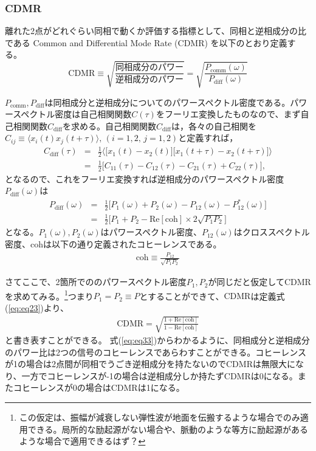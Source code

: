 \subsubsection{CDMR}
離れた2点がどれぐらい同相で動くか評価する指標として、同相と逆相成分の比である Common and Differential Mode Rate (CDMR) を以下のとおり定義する。
\begin{equation}
  \boxed{\mathrm{CDMR} \equiv \sqrt{\frac{同相成分のパワー}{逆相成分のパワー}} = \sqrt{\frac{P_{\mathrm{comm}}(\omega)}{P_{\mathrm{diff}}(\omega)}}} \label{eq:eq23}
\end{equation}

$P_{\mathrm{comm}},P_{\mathrm{diff}}$は同相成分と逆相成分についてのパワースペクトル密度である。パワースペクトル密度は自己相関関数$C(\tau)$をフーリエ変換したものなので、まず自己相関関数$C_{\mathrm{diff}}$を求める。自己相関関数$C_{\mathrm{diff}}$は，各々の自己相関を$ C_{ij} \equiv \langle x_{i}(t)x_{j}(t+\tau)\rangle,\, (i=1,2,\,j=1,2)$と定義すれば， 
\begin{eqnarray}
  C_{\mathrm{diff}}(\tau) &=& \frac{1}{2}
  \biggl\langle
  \biggl[ x_{1}(t)-x_{2}(t) \biggr] \biggl[ x_{1}(t+\tau)-x_{2}(t+\tau) \biggr]
  \biggr\rangle \\
  &=& \frac{1}{2}\biggl[ C_{11}(\tau) - C_{12}(\tau) - C_{21}(\tau) + C_{22}(\tau) \biggr], 
\end{eqnarray}
となるので、これをフーリエ変換すれば逆相成分のパワースペクトル密度$P_{\mathrm{diff}}(\omega)$は
\begin{eqnarray}
  P_{\mathrm{diff}}(\omega) &=& \frac{1}{2}\biggl[ P_{1}(\omega) + P_{2}(\omega) - P_{12}(\omega) - P_{12}^*(\omega) \biggr]\\
  &=& \frac{1}{2} \biggl[ P_{1}+P_{2} - \mathrm{Re}\left[\mathrm{coh} \right]\times2\sqrt{P_{1}P_{2}} \biggr] \label{eq:eq31}
\end{eqnarray}
となる。$P_{1}(\omega),P_{2}(\omega)$はパワースペクトル密度、$P_{12}(\omega)$はクロススペクトル密度、$\mathrm{coh}$は以下の通り定義されたコヒーレンスである。
\begin{eqnarray}
  \mathrm{coh} \equiv \frac{P_{12}}{\sqrt{P_{1}P_{2}}}
\end{eqnarray}


さてここで、2箇所でののパワースペクトル密度$P_{1},P_{2}$が同じだと仮定してCDMRを求めてみる。\footnote[3]{この仮定は、振幅が減衰しない弾性波が地面を伝搬するような場合でのみ適用できる。局所的な励起源がない場合や、脈動のような等方に励起源があるような場合で適用できるはず？}つまり$P_{1}=P_{2}\equiv P$とすることができて、$\mathrm{CDMR}$は定義式(\ref{eq:eq23})より、
\begin{eqnarray}
 \mathrm{CDMR} = \sqrt{\frac{1 + \mathrm{Re} \left[\mathrm{coh} \right] }{1 - \mathrm{Re} \left[\mathrm{coh} \right]}} \label{eq:eq33}
\end{eqnarray}
と書き表すことができる。
式(\ref{eq:eq33})からわかるように、同相成分と逆相成分のパワー比は2つの信号のコヒーレンスであらわすことができる。コヒーレンスが1の場合は2点間が同相でうごき逆相成分を持たないのでCDMRは無限大になり、一方でコヒーレンスが-1の場合は逆相成分しか持たずCDMRは0になる。またコヒーレンスが0の場合はCDMRは1になる。


